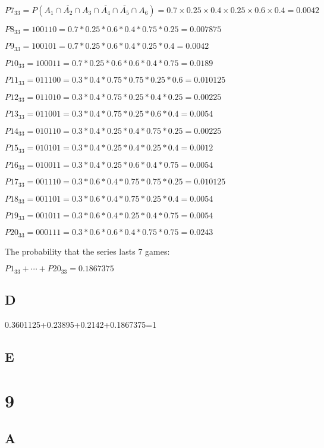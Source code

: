 \documentclass{article}
\begin{document}
	$P7_{33}=P(A_1\cap \overline{A_2}\cap A_3\cap \overline{A_4}\cap \overline{A_5}\cap A_6)=0.7\times 0.25\times 0.4\times 0.25\times 0.6\times 0.4=0.0042$
	
	$P8_{33}=100110=0.7*0.25*0.6*0.4*0.75*0.25=0.007875$
	
	$P9_{33}=1 0 0 1 0 1=0.7*0.25*0.6*0.4*0.25*0.4=0.0042$
	
	$P10_{33}=1 0 0 0 1 1=0.7*0.25*0.6*0.6*0.4*0.75=0.0189$
	
	$P11_{33}=0 1 1 1 0 0=0.3*0.4*0.75*0.75*0.25*0.6=0.010125$
	
	$P12_{33}=0 1 1 0 1 0=0.3*0.4*0.75*0.25*0.4*0.25=0.00225$
	
	$P13_{33}=0 1 1 0 0 1=0.3*0.4*0.75*0.25*0.6*0.4=0.0054$
	
	$P14_{33}=0 1 0 1 1 0=0.3*0.4*0.25*0.4*0.75*0.25=0.00225$
	
	$P15_{33}=0 1 0 1 0 1=0.3*0.4*0.25*0.4*0.25*0.4 =0.0012$
	
	$P16_{33}=0 1 0 0 1 1=0.3*0.4*0.25*0.6*0.4*0.75=0.0054$
	
	$P17_{33}=0 0 1 1 1 0=0.3*0.6*0.4*0.75*0.75*0.25=0.010125$
	
	$P18_{33}=0 0 1 1 0 1=0.3*0.6*0.4*0.75*0.25*0.4=0.0054$
	
	$P19_{33}=0 0 1 0 1 1=0.3*0.6*0.4*0.25*0.4*0.75=0.0054$
	
	$P20_{33}=0 0 0 1 1 1=0.3*0.6*0.6*0.4*0.75*0.75=0.0243$
	
	The probability that the series lasts 7 games:
	
	$P1_{33}+\cdots+P20_{33}=0.1867375$
	
	\subsection*{D}
	
	0.3601125+0.23895+0.2142+0.1867375=1
	
	\subsection*{E}
	
	
	
	\section*{9}
	
	\subsection*{A}
	
\end{document}
